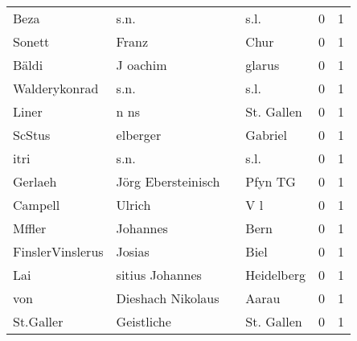 \begin{center}
\begin{tiny}
\begin{longtabu}{llllrr}
                     Beza &                               s.n. &             &                                        s.l. &          0 &         1 \\
                   Sonett &                              Franz &             &                                        Chur &          0 &         1 \\
                    Bäldi &                           J oachim &             &                                      glarus &          0 &         1 \\
            Walderykonrad &                               s.n. &             &                                        s.l. &          0 &         1 \\
                    Liner &                               n ns &             &                                  St. Gallen &          0 &         1 \\
                   ScStus &                           elberger &             &                                     Gabriel &          0 &         1 \\
                     itri &                               s.n. &             &                                        s.l. &          0 &         1 \\
                  Gerlaeh &                 Jörg Ebersteinisch &             &                                     Pfyn TG &          0 &         1 \\
                  Campell &                             Ulrich &             &                                         V l &          0 &         1 \\
                   Mffler &                           Johannes &             &                                        Bern &          0 &         1 \\
         FinslerVinslerus &                             Josias &             &                                        Biel &          0 &         1 \\
                      Lai &                    sitius Johannes &             &                                  Heidelberg &          0 &         1 \\
                      von &                  Dieshach Nikolaus &             &                                       Aarau &          0 &         1 \\
                St.Galler &                         Geistliche &             &                                  St. Gallen &          0 &         1 \\

\end{longtabu}
\end{tiny}
\end{center}
